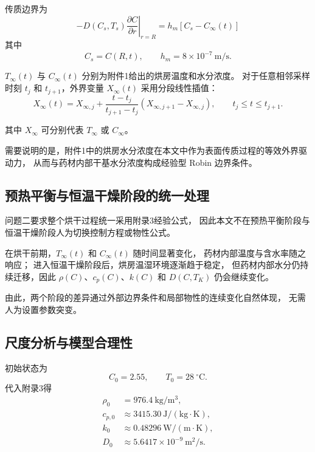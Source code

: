 \documentclass[UTF8,a4paper,12pt]{ctexart}
\begin{document}
传质边界为
\begin{equation}
\boxed{
-D(C_s,T_s)
\left.
\frac{\partial C}{\partial r}
\right|_{r=R}
=
h_m\left[C_s-C_{\infty}(t)\right]
}
\label{eq:massbc}
\end{equation}
其中
\begin{equation}
C_s=C(R,t),\qquad
h_m=8\times10^{-7}~\mathrm{m/s}.
\end{equation}

$T_{\infty}(t)$ 与 $C_{\infty}(t)$ 分别为附件1给出的烘房温度和水分浓度。
对于任意相邻采样时刻 $t_j$ 和 $t_{j+1}$，外界变量 $X_{\infty}(t)$ 采用分段线性插值：
\begin{equation}
X_{\infty}(t)
=
X_{\infty,j}
+
\frac{t-t_j}{t_{j+1}-t_j}
\left(
X_{\infty,j+1}-X_{\infty,j}
\right),
\qquad
t_j\le t\le t_{j+1}.
\end{equation}

其中 $X_{\infty}$ 可分别代表 $T_{\infty}$ 或 $C_{\infty}$。

需要说明的是，附件1中的烘房水分浓度在本文中作为表面传质过程的等效外界驱动力，
从而与药材内部干基水分浓度构成经验型 Robin 边界条件。

\subsection{预热平衡与恒温干燥阶段的统一处理}

问题二要求整个烘干过程统一采用附录3经验公式，
因此本文不在预热平衡阶段与恒温干燥阶段人为切换控制方程或物性公式。

在烘干前期，$T_{\infty}(t)$ 和 $C_{\infty}(t)$ 随时间显著变化，
药材内部温度与含水率随之响应；
进入恒温干燥阶段后，烘房温湿环境逐渐趋于稳定，
但药材内部水分仍持续迁移，因此 $\rho(C)$、$c_p(C)$、$k(C)$ 和 $D(C,T_K)$ 仍会继续变化。

由此，两个阶段的差异通过外部边界条件和局部物性的连续变化自然体现，
无需人为设置参数突变。

\subsection{尺度分析与模型合理性}

初始状态为
\begin{equation}
C_0=2.55,\qquad T_0=28~^\circ\mathrm{C}.
\end{equation}
代入附录3得
\begin{align}
\rho_0&=976.4~\mathrm{kg/m^3},\\
c_{p,0}&\approx3415.30~\mathrm{J/(kg\cdot K)},\\
k_0&\approx0.48296~\mathrm{W/(m\cdot K)},\\
D_0&\approx5.6417\times10^{-9}~\mathrm{m^2/s}.
\end{align}
\end{document}
